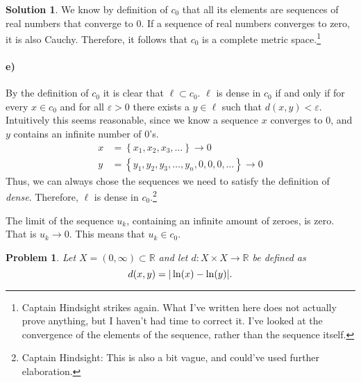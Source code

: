 \documentclass[a4paper]{article}
\newtheorem{prb}{Problem}
\theoremstyle{definition}
\newtheorem{sol}{Solution}
\begin{document}
\begin{sol}
We know by definition of $c_0$ that all its elements are sequences of real
numbers that converge to $0$.  If a sequence of real numbers converges to zero,
it is also Cauchy. Therefore, it follows that $c_0$ is a complete metric
space.\footnote{Captain Hindsight strikes again. What I've written here does
not actually prove anything, but I haven't had time to correct it. I've looked at
the convergence of the elements of the sequence, rather than the sequence itself.}

\paragraph{e)}

By the definition of $c_0$ it is clear that $\ell \subset c_0$.  $\ell$ is
dense in $c_0$ if and only if for every $x \in c_0$ and for all $\varepsilon >
0$ there exists a $y \in \ell$ such that $d(x, y) < \varepsilon$.  Intuitively
this seems reasonable, since we know a sequence $x$ converges to $0$, and $y$
contains an infinite number of $0$'s.
\begin{align*}
x &= \left\{ x_1, x_2, x_3, \ldots \right\} \longrightarrow 0\\
y &= \left\{ y_1, y_2, y_3, \ldots, y_n, 0, 0, 0, \ldots \right\} \longrightarrow 0
\end{align*}
Thus, we can always chose the sequences we need to satisfy the definition of
\textit{dense}.  Therefore, $\ell$ is dense in $c_0$.\footnote{Captain
Hindsight: This is also a bit vague, and could've used further elaboration.}

The limit of the sequence $u_k$, containing an infinite amount of zeroes, is
zero.  That is $u_k \longrightarrow 0$. This means that $u_k \in c_0$.
\end{sol}

\pagebreak
\begin{prb}
  Let $X = \left( 0, \infty \right) \subset \mathbb{R}$ and let $d : X \times X \longrightarrow \mathbb{R}$ be defined as
  \begin{equation}
    \notag
    d(x, y) = | \ln(x) - \ln(y)|.
  \end{equation}
\end{prb}
\end{document}
